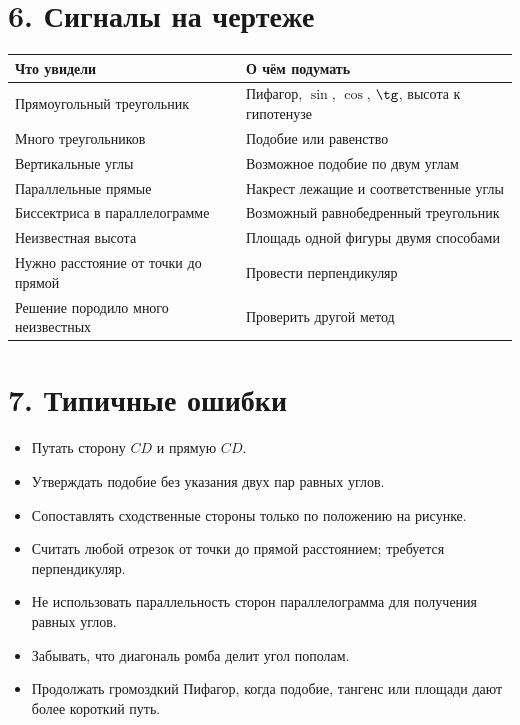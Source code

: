 \documentclass[a4paper,12pt]{article}
\begin{document}
\section*{\color{darkaccent}6. Сигналы на чертеже}
\begin{tabularx}{\linewidth}{@{}p{.35\linewidth}X@{}}
\toprule
\textbf{Что увидели} & \textbf{О чём подумать}\\
\midrule
Прямоугольный треугольник & Пифагор, $\sin$, $\cos$, $\tg$, высота к гипотенузе\\
Много треугольников & Подобие или равенство\\
Вертикальные углы & Возможное подобие по двум углам\\
Параллельные прямые & Накрест лежащие и соответственные углы\\
Биссектриса в параллелограмме & Возможный равнобедренный треугольник\\
Неизвестная высота & Площадь одной фигуры двумя способами\\
Нужно расстояние от точки до прямой & Провести перпендикуляр\\
Решение породило много неизвестных & Проверить другой метод\\
\bottomrule
\end{tabularx}

\section*{\color{darkaccent}7. Типичные ошибки}
\begin{itemize}
\item Путать сторону $CD$ и прямую $CD$.
\item Утверждать подобие без указания двух пар равных углов.
\item Сопоставлять сходственные стороны только по положению на рисунке.
\item Считать любой отрезок от точки до прямой расстоянием; требуется перпендикуляр.
\item Не использовать параллельность сторон параллелограмма для получения равных углов.
\item Забывать, что диагональ ромба делит угол пополам.
\item Продолжать громоздкий Пифагор, когда подобие, тангенс или площади дают более короткий путь.
\end{itemize}

\newpage
\end{document}
